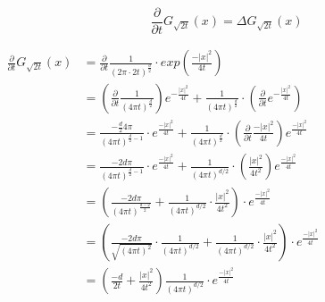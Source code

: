 \documentclass[
 ngerman]{report}
\begin{document}
\newcommand{\Dt}{\frac {\partial} {\partial t}}
$$\Dt G_{\sqrt{2t}} (x) = \Delta G_{\sqrt{2t}} (x) $$
\begin{minipage}{0.5\linewidth}
  \small
	$ \begin{aligned}
		\Dt G_{\sqrt{2t}} (x) 
		&=  \Dt \frac {1} {(2\pi\cdot 2t)^{ \frac {d} {2}}}\cdot 
			exp({ \frac {-|x|^2} {4t}})
		\\
		&= \left(\Dt \frac {1} {(4 \pi t)^{ \frac {d} {2}}}\right)
			e^{ -\frac {|x|^2} {4t}} + \frac {1} {(4 \pi t)^{ \frac {d} {2}}}\cdot  
			\left(\Dt e^{ -\frac {|x|^2} {4t}}\right)
		\\
		&=  \frac {- \frac {d} {2}4\pi } {(4\pi t)^{ \frac {d} {2} - 1}} \cdot e^{ \frac {-|x|^2} {4t}}
			+ \frac {1} {(4 \pi t)^{ \frac {d} {2}}}\cdot  
			\left(\Dt \frac {-|x|^2} {4t}\right)e^{ \frac {-|x|^2} {4t}}
		\\
		&=  \frac {-2d\pi } {(4\pi t)^{ \frac {d} {2} - 1}} \cdot e^{ \frac {-|x|^2} {4t}}
			+ \frac {1} {(4 \pi t)^{d/2}}\cdot  
			\left(\frac {|x|^2} {4t^2}\right)e^{ \frac {-|x|^2} {4t}}
		\\
		&=  \left(\frac {-2d\pi } {(4\pi t)^{ \frac {d-2} {2}}} 
			+ \frac {1} {(4 \pi t)^{d/2}}\cdot  
			\frac {|x|^2} {4t^2} \right ) \cdot e^{ \frac {-|x|^2} {4t}}
		\\
		&=  \left(\frac {-2d \pi } {\sqrt{(4\pi t)^2}} \cdot \frac {1} {(4 \pi t)^{d/2}}
			+ \frac {1} {(4 \pi t)^{d/2}}\cdot  
			\frac {|x|^2} {4t^2} \right ) \cdot e^{ \frac {-|x|^2} {4t}}
		\\
		&=  \left(\frac {-d } {2t} + \frac {|x|^2} {4t^2} \right )
			\frac {1} {(4 \pi t)^{d/2}}\cdot e^{ \frac {-|x|^2} {4t}}
		\\
	\end{aligned} $
\end{minipage}
\small
\end{document}
